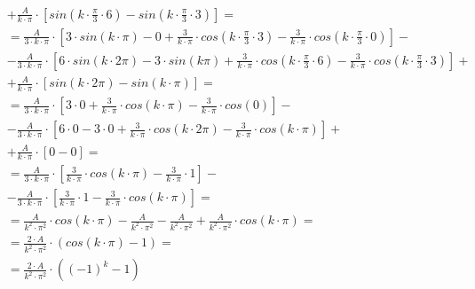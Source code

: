 \begin{task}
\begin{align*}
&+ \frac{A}{k\cdot \pi} \cdot \left[sin\left( k \cdot \frac{\pi}{3} \cdot 6\right) - sin\left( k \cdot \frac{\pi}{3} \cdot 3\right)\right]=\\
&=\frac{A}{3 \cdot k \cdot \pi} \cdot \left[ 3 \cdot sin\left( k \cdot \pi\right) -  0 
+ \frac{3}{k\cdot \pi}\cdot cos\left( k \cdot \frac{\pi}{3} \cdot 3\right) -  \frac{3}{k\cdot \pi}\cdot cos\left( k \cdot \frac{\pi}{3} \cdot 0\right)\right]-\\
&-\frac{A}{3 \cdot k \cdot \pi} \cdot \left[ 6 \cdot sin\left( k \cdot 2 \pi \right) -  3 \cdot sin\left( k \pi \right) + \frac{3}{k\cdot \pi}\cdot cos\left( k \cdot \frac{\pi}{3} \cdot 6\right) - \frac{3}{k\cdot \pi}\cdot cos\left( k \cdot \frac{\pi}{3} \cdot 3\right)\right]+\\
&+ \frac{A}{k\cdot \pi} \cdot \left[sin\left( k \cdot 2\pi\right) - sin\left( k \cdot \pi \right)\right]=\\
&=\frac{A}{3 \cdot k \cdot \pi} \cdot \left[ 3 \cdot 0 + \frac{3}{k\cdot \pi}\cdot cos\left( k \cdot \pi\right) -  \frac{3}{k\cdot \pi}\cdot cos\left(0\right)\right]-\\
&-\frac{A}{3 \cdot k \cdot \pi} \cdot \left[ 6 \cdot 0 -  3 \cdot 0 + \frac{3}{k\cdot \pi}\cdot cos\left( k \cdot 2 \pi \right) - \frac{3}{k\cdot \pi}\cdot cos\left( k \cdot \pi\right)\right]+\\
&+ \frac{A}{k\cdot \pi} \cdot \left[0 - 0\right]=\\
&=\frac{A}{3 \cdot k \cdot \pi} \cdot \left[\frac{3}{k\cdot \pi}\cdot cos\left( k \cdot \pi\right) -  \frac{3}{k\cdot \pi}\cdot 1\right]-\\
&-\frac{A}{3 \cdot k \cdot \pi} \cdot \left[\frac{3}{k\cdot \pi}\cdot 1 - \frac{3}{k\cdot \pi}\cdot cos\left( k \cdot \pi\right)\right]=\\
&=\frac{A}{k^2 \cdot \pi^2} \cdot cos\left( k \cdot \pi\right) -  \frac{A}{k^2 \cdot \pi^2}-\frac{A}{k^2 \cdot \pi^2} + \frac{A}{k^2 \cdot \pi^2} \cdot cos\left( k \cdot \pi\right)=\\
&=\frac{2 \cdot A}{k^2 \cdot \pi^2} \cdot \left(cos\left( k \cdot \pi\right) -  1\right)=\\
&=\frac{2 \cdot A}{k^2 \cdot \pi^2} \cdot \left((-1)^k -  1\right)\\
\end{align*}



\end{task}
